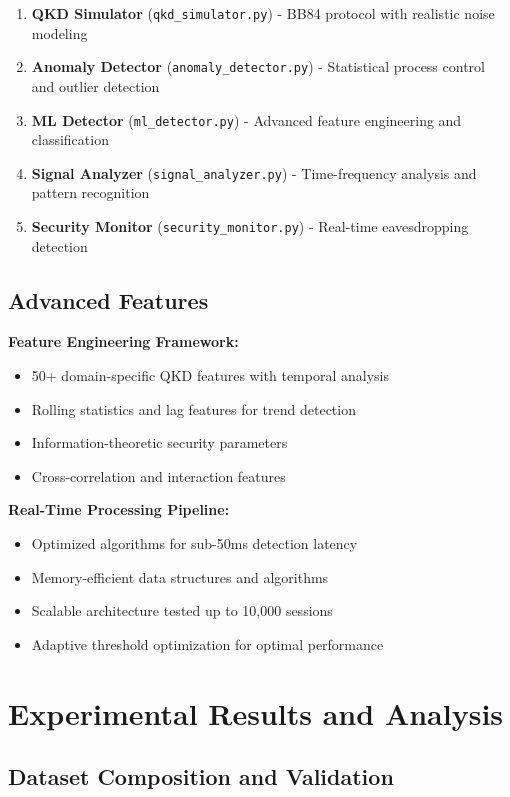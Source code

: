 \documentclass[12pt,a4paper]{article}
\begin{document}
\begin{enumerate}
    \item \textbf{QKD Simulator} (\texttt{qkd\_simulator.py}) - BB84 protocol with realistic noise modeling
    \item \textbf{Anomaly Detector} (\texttt{anomaly\_detector.py}) - Statistical process control and outlier detection
    \item \textbf{ML Detector} (\texttt{ml\_detector.py}) - Advanced feature engineering and classification
    \item \textbf{Signal Analyzer} (\texttt{signal\_analyzer.py}) - Time-frequency analysis and pattern recognition
    \item \textbf{Security Monitor} (\texttt{security\_monitor.py}) - Real-time eavesdropping detection
\end{enumerate}

\subsection{Advanced Features}

\textbf{Feature Engineering Framework:}
\begin{itemize}
    \item 50+ domain-specific QKD features with temporal analysis
    \item Rolling statistics and lag features for trend detection
    \item Information-theoretic security parameters
    \item Cross-correlation and interaction features
\end{itemize}

\textbf{Real-Time Processing Pipeline:}
\begin{itemize}
    \item Optimized algorithms for sub-50ms detection latency
    \item Memory-efficient data structures and algorithms
    \item Scalable architecture tested up to 10,000 sessions
    \item Adaptive threshold optimization for optimal performance
\end{itemize}

\section{Experimental Results and Analysis}

\subsection{Dataset Composition and Validation}
\end{document}
